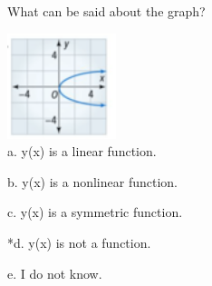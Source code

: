 
What can be said about the graph? 

\includegraphics[width=1.25in]{../../Images/NonlinearEquationsQ6.png} \\
 
a. y(x) is a linear function.

b. y(x) is a nonlinear function.

c.  y(x) is a symmetric function.

*d. y(x) is not a function.

e. I do not know. \\

